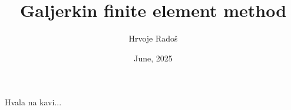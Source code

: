 \documentclass[zavrsnirad]{../fer}
\title{Galjerkin finite element method}
\author{Hrvoje Radoš}
\date{June, 2025}
\begin{document}
\maketitle






\begin{zahvale}
	Hvala na kavi...
\end{zahvale}


\mainmatter


\tableofcontents


\end{document}

